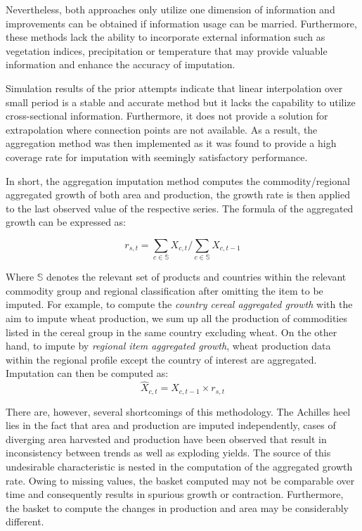 \documentclass[nojss]{jss}\usepackage[]{graphicx}\usepackage[]{color}
\begin{document}
Nevertheless, both approaches only utilize one dimension of
information and improvements can be obtained if information usage
can be married. Furthermore, these methods lack the ability to
incorporate external information such as vegetation indices,
precipitation or temperature that may provide valuable information and
enhance the accuracy of imputation.

Simulation results of the prior attempts indicate that linear
interpolation over small period is a stable and accurate method but it
lacks the capability to utilize cross-sectional
information. Furthermore, it does not provide a solution for
extrapolation where connection points are not available. As a result,
the aggregation method was then implemented as it was found to provide
a high coverage rate for imputation with seemingly satisfactory
performance.

In short, the aggregation imputation method computes the
commodity/regional aggregated growth of both area and production, the
growth rate is then applied to the last observed value of the
respective series. The formula of the aggregated growth can be
expressed as:

\begin{equation}
  \label{eq:aggregateGrowth}
  r_{s, t} = \sum_{c \in \mathbb{S}} X_{c, t}/\sum_{c \in \mathbb{S}} X_{c, t-1}
\end{equation}

Where $\mathbb{S}$ denotes the relevant set of products and countries
within the relevant commodity group and regional classification after
omitting the item to be imputed. For example, to compute the
\textit{country cereal aggregated growth} with the aim to impute wheat
production, we sum up all the production of commodities listed in the
cereal group in the same country excluding wheat. On the other hand,
to impute by \textit{regional item aggregated growth}, wheat
production data within the regional profile except the country of
interest are aggregated.\\


Imputation can then be computed as:
\begin{equation}
  \hat{X}_{c, t} = X_{c, t-1} \times r_{s, t}
\end{equation}
  

There are, however, several shortcomings of this methodology. The
Achilles heel lies in the fact that area and production are imputed
independently, cases of diverging area harvested and production have
been observed that result in inconsistency between trends as well as
exploding yields. The source of this undesirable characteristic is
nested in the computation of the aggregated growth rate. Owing to
missing values, the basket computed may not be comparable over time
and consequently results in spurious growth or
contraction. Furthermore, the basket to compute the changes in
production and area may be considerably different.
\end{document}
